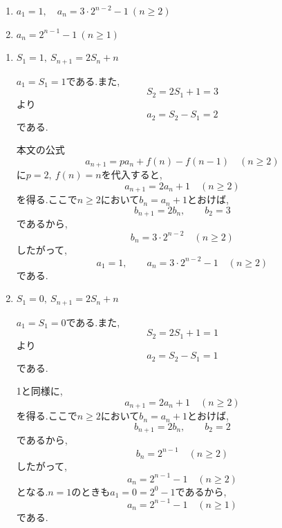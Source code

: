     \noindent{}
    \begin{enumerate}[label=(\arabic*),parsep=3pt,format=\bookitemlink{example-summation-2}{answer}{problem}]
      \item $\displaystyle a_1=1,\quad a_n=3\cdot2^{n-2}-1\ (n\ge2)$
      \item $\displaystyle a_n=2^{n-1}-1\ (n\ge1)$
    \end{enumerate}

    \noindent{}
    \begin{enumerate}[label=(\arabic*),parsep=3pt,format=\bookitemlink{example-summation-2}{solution}{problem}]
    \item $\displaystyle S_1=1,\ S_{n+1}=2S_n+n$

        $a_1=S_1=1$である.また,
        \[
          S_2=2S_1+1=3
        \]
        より
        \[
          a_2=S_2-S_1=2
        \]
        である.

        本文の公式
        \[
          a_{n+1}=pa_n+f(n)-f(n-1)\quad(n\ge2)
        \]
        に$p=2,\ f(n)=n$を代入すると,
        \[
          a_{n+1}=2a_n+1\quad(n\ge2)
        \]
        を得る.ここで$n\ge2$において$b_n=a_n+1$とおけば,
        \[
          b_{n+1}=2b_n,\qquad b_2=3
        \]
        であるから,
        \[
          b_n=3\cdot2^{n-2}\quad(n\ge2)
        \]
        したがって,
        \[
          a_1=1,\qquad a_n=3\cdot2^{n-2}-1\quad(n\ge2)
        \]
        である.

    \item $\displaystyle S_1=0,\ S_{n+1}=2S_n+n$

        $a_1=S_1=0$である.また,
        \[
          S_2=2S_1+1=1
        \]
        より
        \[
          a_2=S_2-S_1=1
        \]
        である.

        1と同様に,
        \[
          a_{n+1}=2a_n+1\quad(n\ge2)
        \]
        を得る.ここで$n\ge2$において$b_n=a_n+1$とおけば,
        \[
          b_{n+1}=2b_n,\qquad b_2=2
        \]
        であるから,
        \[
          b_n=2^{n-1}\quad(n\ge2)
        \]
        したがって,
        \[
          a_n=2^{n-1}-1\quad(n\ge2)
        \]
        となる.$n=1$のときも$a_1=0=2^0-1$であるから,
        \[
          a_n=2^{n-1}-1\quad(n\ge1)
        \]
        である.
    \end{enumerate}

